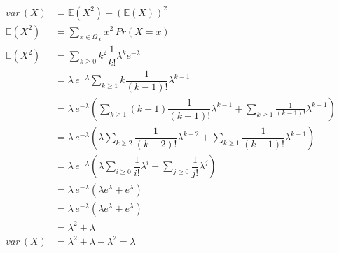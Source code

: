 \documentclass[12pt, a4paper]{article}
\begin{document}
    \begin{equation}
        \label{whatever}
        \begin{split}
            var\,(X) & = \mathbb{E} (X^2) - (\mathbb{E} (X))^2 \\
            \mathbb{E} (X^2) &= \sum_{x \mathop \in \Omega_{X}} x^2 \, Pr(X = x) \\
            \mathbb{E} (X^2) &= \sum_{k \mathop \ge 0} {k^2 \dfrac 1 {k!} \lambda^k e^{-\lambda} } \\
            & = \lambda\, e^{-\lambda} \sum_{k \mathop \ge 1} {k \dfrac 1 {(k - 1)!} \lambda^{k - 1} } \\
            & = \lambda\, e^{-\lambda} ( \sum_{k \mathop \ge 1} {(k - 1) \dfrac 1 {(k - 1)!} \lambda^{k - 1} } + \sum_{k \mathop \ge 1} {\frac 1 {(k - 1)!} \lambda^{k - 1} }  ) \\
            & = \lambda\, e^{-\lambda} ( \lambda \sum_{k \mathop \ge 2} {\dfrac 1 {(k - 2)!} \lambda^{k - 2} } + \sum_{k \mathop \ge 1} {\dfrac 1 {(k - 1)!} \lambda^{k - 1} } ) \\
            & = \lambda\, e^{-\lambda} ( \lambda \sum_{i \mathop \ge 0} {\dfrac 1 {i!} \lambda^i} + \sum_{j \mathop \ge 0} {\dfrac 1 {j!} \lambda^j} ) \\
            & = \lambda\, e^{-\lambda} ( \lambda e^\lambda + e^\lambda) \\
            & = \lambda\, e^{-\lambda} ( \lambda e^\lambda + e^\lambda) \\
            & = \lambda^2 + \lambda \\
            var\,(X) & = \lambda^{2} + \lambda - \lambda^{2} = \lambda \\
        \end{split}
    \end{equation}
\end{document}
